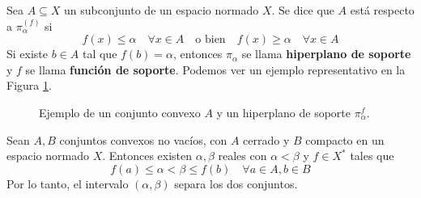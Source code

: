 \begin{definicion}
    Sea $A \subseteq X$ un subconjunto de un espacio normado $X$. Se dice que $A$ está  respecto a $\pi_\alpha^{(f)}$ si
    \begin{equation*}
        f(x) \leq \alpha \quad \forall x \in A \quad \text{o bien} \quad f(x) \geq \alpha \quad \forall x \in A
    \end{equation*}
    Si existe $b \in A$ tal que $f(b) = \alpha$, entonces $\pi_\alpha$ se llama \textbf{hiperplano de soporte} y $f$ se llama \textbf{función de soporte}. Podemos ver un ejemplo representativo en la Figura \ref{fig:hiperplano-soporte}.
\end{definicion}

\begin{figure}
    \centering
    \caption{Ejemplo de un conjunto convexo $A$ y un hiperplano de soporte $\pi_\alpha^f$.}
    \label{fig:hiperplano-soporte}
\end{figure}

\begin{teo}\label{teo:hahn-banach-fuerte}
    Sean $A, B$ conjuntos convexos no vacíos, con $A$ cerrado y $B$ compacto en un espacio normado $X$. Entonces existen $\alpha, \beta$ reales con $\alpha < \beta$ y $f \in X^*$ tales que
    \begin{equation*}
        f(a) \leq \alpha < \beta \leq f(b) \quad \forall a \in A, b \in B
    \end{equation*}
    Por lo tanto, el intervalo $(\alpha, \beta)$ separa los dos conjuntos.
\end{teo}

